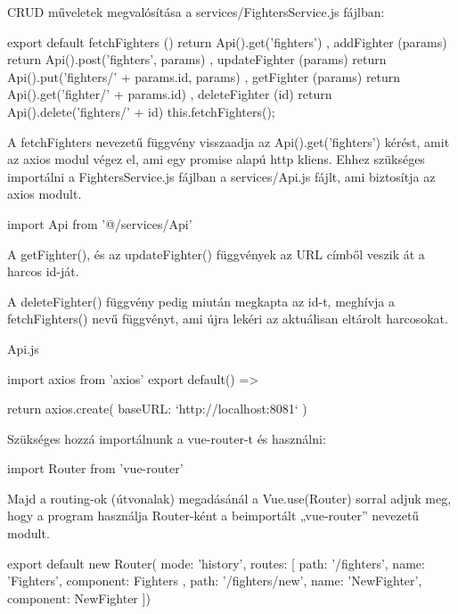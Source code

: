 
CRUD műveletek megvalósítása a services/FightersService.js fájlban:

\begin{cpp}
export default {
  fetchFighters () {
    return Api().get('fighters')
  }, 
  addFighter (params) {
    return Api().post('fighters', params)
  },
  updateFighter (params) {
    return Api().put('fighters/' + params.id, params)
  },
  getFighter (params) {
    return Api().get('fighter/' + params.id)
  },
  deleteFighter (id) {
    return Api().delete('fighters/' + id)
    this.fetchFighters();
  }
}
\end{cpp}

A fetchFighters nevezetű függvény visszaadja az Api().get(’fighters’) kérést, amit az axios modul végez el, ami egy promise alapú http kliens. Ehhez szükséges importálni a FightersService.js fájlban a services/Api.js fájlt, ami biztosítja az axios modult.

\begin{cpp}
import Api from '@/services/Api'
\end{cpp}

A getFighter(), és az updateFighter() függvények az URL címből veszik át a harcos id-ját.

A deleteFighter() függvény pedig miután megkapta az id-t, meghívja a fetchFighters() nevű függvényt, ami újra lekéri az aktuálisan eltárolt harcosokat.

Api.js

\begin{cpp}
import axios from 'axios'
export default() => {

  return axios.create({
    baseURL: `http://localhost:8081`
  })
}
\end{cpp}


Szükséges hozzá importálnunk a vue-router-t és használni:

\begin{cpp}
import Router from 'vue-router'
\end{cpp}

Majd a routing-ok (útvonalak) megadásánál a Vue.use(Router) sorral adjuk meg, hogy a program használja Router-ként a beimportált „vue-router” nevezetű modult.

\begin{cpp}
export default new Router({
mode: 'history',
  routes: [
{
      path: '/fighters',
      name: 'Fighters',
      component: Fighters
  },
  {
      path: '/fighters/new',
      name: 'NewFighter',
      component: NewFighter  }]})
\end{cpp}

